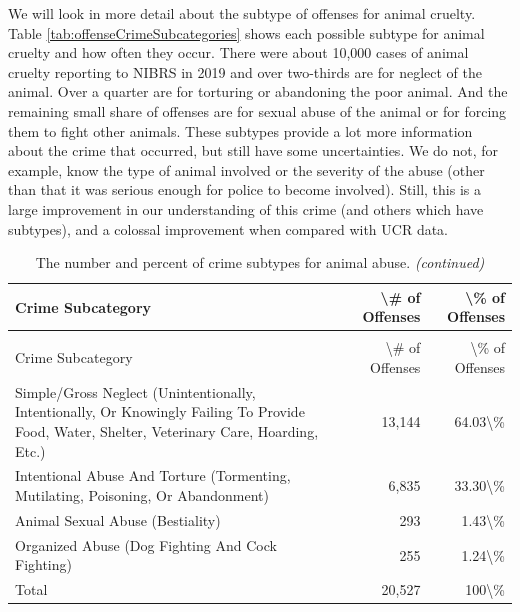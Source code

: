 \documentclass[
]{krantz}
\begin{document}
We will look in more detail about the subtype of offenses
for animal cruelty. Table
\ref{tab:offenseCrimeSubcategories} shows each possible
subtype for animal cruelty and how often they occur. There
were about 10,000 cases of animal cruelty reporting to NIBRS
in 2019 and over two-thirds are for neglect of the animal.
Over a quarter are for torturing or abandoning the poor
animal. And the remaining small share of offenses are for
sexual abuse of the animal or for forcing them to fight
other animals. These subtypes provide a lot more information
about the crime that occurred, but still have some
uncertainties. We do not, for example, know the type of
animal involved or the severity of the abuse (other than
that it was serious enough for police to become involved).
Still, this is a large improvement in our understanding of
this crime (and others which have subtypes), and a colossal
improvement when compared with UCR data.

\begin{longtable}[t]{lrr}
\caption{\label{tab:offenseCrimeSubcategoriesAnimalAbuse}\label{tab:offenseCrimeSubcategoriesAnimalAbuse}The number and percent of crime subtypes for animal abuse.}\\
\toprule
Crime Subcategory & \textbackslash{}\# of Offenses & \textbackslash{}\% of Offenses\\
\midrule
\endfirsthead
\caption[]{\label{tab:offenseCrimeSubcategoriesAnimalAbuse}\label{tab:offenseCrimeSubcategoriesAnimalAbuse}The number and percent of crime subtypes for animal abuse. \textit{(continued)}}\\
\toprule
Crime Subcategory & \textbackslash{}\# of Offenses & \textbackslash{}\% of Offenses\\
\midrule
\endhead

\endfoot
\bottomrule
\endlastfoot
Simple/Gross Neglect (Unintentionally, Intentionally, Or Knowingly Failing To Provide Food, Water, Shelter, Veterinary Care, Hoarding, Etc.) & 13,144 & 64.03\textbackslash{}\%\\
Intentional Abuse And Torture (Tormenting, Mutilating, Poisoning, Or Abandonment) & 6,835 & 33.30\textbackslash{}\%\\
Animal Sexual Abuse (Bestiality) & 293 & 1.43\textbackslash{}\%\\
Organized Abuse (Dog Fighting And Cock Fighting) & 255 & 1.24\textbackslash{}\%\\
Total & 20,527 & 100\textbackslash{}\%\\*
\end{longtable}
\end{document}
